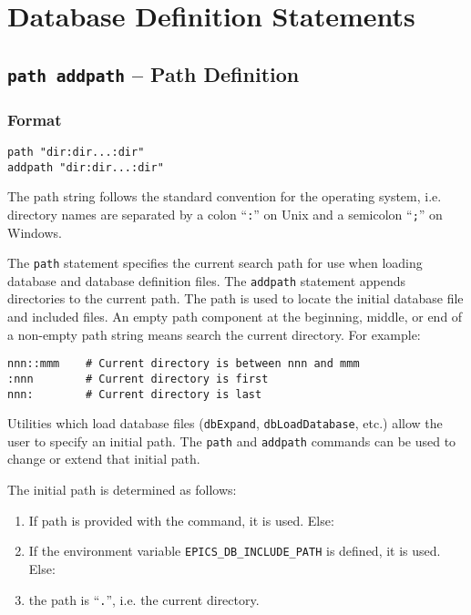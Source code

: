 \section{Database Definition Statements}

\subsection{\texttt{path addpath} -- Path Definition}

\subsubsection{Format}

\begin{verbatim}
path "dir:dir...:dir"
addpath "dir:dir...:dir"
\end{verbatim}

The path string follows the standard convention for the operating system, i.e. directory names are separated by a colon ``\verb|:|'' on Unix
and a semicolon ``\verb|;|'' on Windows.

The \verb|path| statement specifies the current search path for use when loading database and database definition files.
The \verb|addpath| statement appends directories to the current path.
The path is used to locate the initial database file and included files.
An empty path component at the beginning, middle, or end of a non-empty path string means search the current directory.
For example:

\begin{verbatim}
nnn::mmm    # Current directory is between nnn and mmm
:nnn        # Current directory is first
nnn:        # Current directory is last
\end{verbatim}

Utilities which load database files (\verb|dbExpand|, \verb|dbLoadDatabase|, etc.) allow the user to specify an initial path.
The \verb|path| and \verb|addpath| commands can be used to change or extend that initial path.

The initial path is determined as follows:

\begin{enumerate}
\item If path is provided with the command, it is used.
Else:

\item If the environment variable \verb|EPICS_DB_INCLUDE_PATH| is defined, it is used.
Else:

\item the path is ``\verb|.|'', i.e. the current directory.
\end{enumerate}

